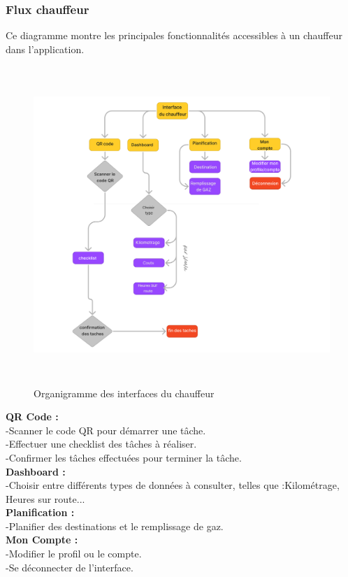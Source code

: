 
\subsubsection{Flux chauffeur}
Ce diagramme montre les principales fonctionnalités accessibles à un chauffeur dans l'application.\\
\begin{figure}[htbp]
  \centering
  \includegraphics[width=1\textwidth,height=12cm]{chap2.images/org chauffeur.png}
  \caption{Organigramme des interfaces du chauffeur}
\end{figure}

\noindent
\textbf{QR Code :}\\
-Scanner le code QR pour démarrer une tâche.\\
-Effectuer une checklist des tâches à réaliser.\\
-Confirmer les tâches effectuées pour terminer la tâche.\\
\textbf{Dashboard :}\\
-Choisir entre différents types de données à consulter, telles que :Kilométrage, Heures sur route...\\
\textbf{Planification :}\\
-Planifier des destinations et le remplissage de gaz.\\
\textbf{Mon Compte :}\\
-Modifier le profil ou le compte.\\
-Se déconnecter de l'interface.\\

